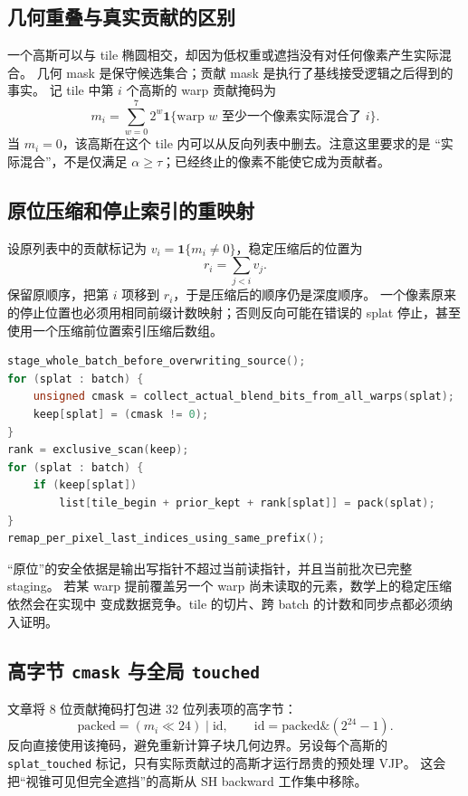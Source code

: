 \subsection{几何重叠与真实贡献的区别}

一个高斯可以与 tile 椭圆相交，却因为低权重或遮挡没有对任何像素产生实际混合。
几何 mask 是保守候选集合；贡献 mask 是执行了基线接受逻辑之后得到的事实。
记 tile 中第 $i$ 个高斯的 warp 贡献掩码为
\begin{equation}
 m_i=\sum_{w=0}^{7}2^w
 \mathbf{1}\{\text{warp }w\text{ 至少一个像素实际混合了 }i\}.
\end{equation}
当 $m_i=0$，该高斯在这个 tile 内可以从反向列表中删去。注意这里要求的是
``实际混合''，不是仅满足 $\alpha\geq\tau$；已经终止的像素不能使它成为贡献者。

\subsection{原位压缩和停止索引的重映射}

设原列表中的贡献标记为 $v_i=\mathbf{1}\{m_i\ne0\}$，稳定压缩后的位置为
\begin{equation}
 r_i=\sum_{j<i}v_j.
\end{equation}
保留原顺序，把第 $i$ 项移到 $r_i$，于是压缩后的顺序仍是深度顺序。
一个像素原来的停止位置也必须用相同前缀计数映射；否则反向可能在错误的 splat
停止，甚至使用一个压缩前位置索引压缩后数组。

\begin{lstlisting}[language=C++,basicstyle=\ttfamily\small,breaklines=true]
stage_whole_batch_before_overwriting_source();
for (splat : batch) {
    unsigned cmask = collect_actual_blend_bits_from_all_warps(splat);
    keep[splat] = (cmask != 0);
}
rank = exclusive_scan(keep);
for (splat : batch) {
    if (keep[splat])
        list[tile_begin + prior_kept + rank[splat]] = pack(splat);
}
remap_per_pixel_last_indices_using_same_prefix();
\end{lstlisting}

``原位''的安全依据是输出写指针不超过当前读指针，并且当前批次已完整 staging。
若某 warp 提前覆盖另一个 warp 尚未读取的元素，数学上的稳定压缩依然会在实现中
变成数据竞争。tile 的切片、跨 batch 的计数和同步点都必须纳入证明。

\subsection{高字节 \texttt{cmask} 与全局 \texttt{touched}}

文章将 8 位贡献掩码打包进 32 位列表项的高字节：
\begin{equation}
 \text{packed}=\left(m_i\ll24\right)\mathbin{|}\text{id},\qquad
 \text{id}=\text{packed}\mathbin{\&}(2^{24}-1).
\end{equation}
反向直接使用该掩码，避免重新计算子块几何边界。另设每个高斯的
\texttt{splat\_touched} 标记，只有实际贡献过的高斯才运行昂贵的预处理 VJP。
这会把``视锥可见但完全遮挡''的高斯从 SH backward 工作集中移除。

